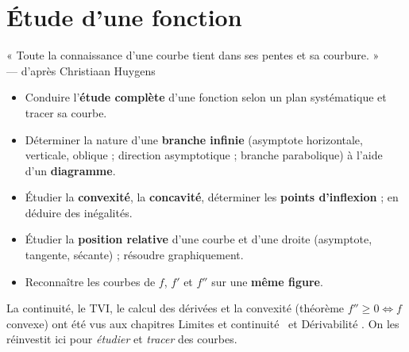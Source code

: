 
\chapter{Étude d'une fonction}

\begin{citationchapitre}
	« Toute la connaissance d'une courbe tient dans ses pentes et sa
	courbure. »\\[0.4em]
	— d'après Christiaan Huygens
\end{citationchapitre}

\begin{objectifs}
	\begin{itemize}[label=\textbullet]
		\item Conduire l'\textbf{étude complète} d'une fonction selon un plan
		systématique et tracer sa courbe.
		\item Déterminer la nature d'une \textbf{branche infinie} (asymptote
		horizontale, verticale, oblique ; direction asymptotique ; branche
		parabolique) à l'aide d'un \textbf{diagramme}.
		\item Étudier la \textbf{convexité}, la \textbf{concavité}, déterminer les
		\textbf{points d'inflexion} ; en déduire des inégalités.
		\item Étudier la \textbf{position relative} d'une courbe et d'une droite
		(asymptote, tangente, sécante) ; résoudre graphiquement.
		\item Reconnaître les courbes de $f$, $f'$ et $f''$ sur une \textbf{même
		figure}.
	\end{itemize}
\end{objectifs}

\begin{remarque}
	La continuité, le TVI, le calcul des dérivées et la convexité (théorème
	$f''\geq 0\iff f$ convexe) ont été vus aux chapitres \og Limites et
	continuité \fg\ et \og Dérivabilité \fg. On les réinvestit ici pour
	\emph{étudier} et \emph{tracer} des courbes.
\end{remarque}



